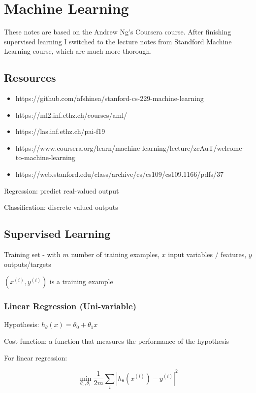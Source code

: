 \chapter{Machine Learning}

These notes are based on the Andrew Ng's Coursera course. After finishing supervised learning I switched to the lecture notes from Standford Machine Learning course, which are much more thorough. 

\section{Resources}
\begin{itemize}
\item https://github.com/afshinea/stanford-cs-229-machine-learning
\item https://ml2.inf.ethz.ch/courses/aml/
\item https://las.inf.ethz.ch/pai-f19
\item https://www.coursera.org/learn/machine-learning/lecture/zcAuT/welcome-to-machine-learning
\item https://web.stanford.edu/class/archive/cs/cs109/cs109.1166/pdfs/37%
\end{itemize}

Regression: predict real-valued output

Classification: discrete valued outputs

\section{Supervised Learning}

Training set - with $m$ number of training examples, $x$ input variables / features, $y$ outputs/targets

$(x^{(i)},y^{(i)})$ is a training example

\subsection{ Linear Regression (Uni-variable)}

Hypothesis: $h_\theta(x) = \theta_0 + \theta_1x$ 

Cost function: a function that measures the performance of the hypothesis

For linear regression: 

$$\min_{\theta_0,\theta_1} \frac{1}{2m}\sum_i| h_\theta(x^{(i)})-y^{(i)} |^2 $$

